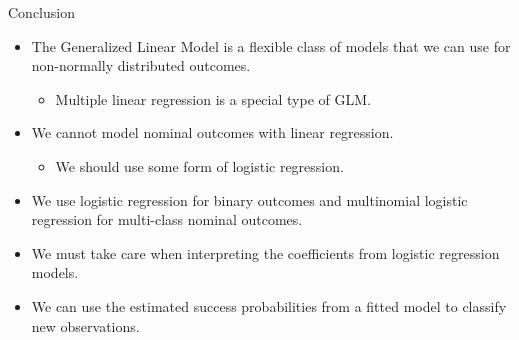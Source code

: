 \documentclass{beamer}\usepackage[]{graphicx}\usepackage[]{color}
\begin{document}
\begin{frame}{Conclusion}
  
  \begin{itemize}
  \item The Generalized Linear Model is a flexible class of models that we can
    use for non-normally distributed outcomes.
    \begin{itemize}
    \item Multiple linear regression is a special type of GLM.
    \end{itemize}
    \vc
  \item We cannot model nominal outcomes with linear regression.
    \begin{itemize}
    \item We should use some form of logistic regression.
    \end{itemize}
    \vc
  \item We use logistic regression for binary outcomes and multinomial logistic
    regression for multi-class nominal outcomes.
    \vc
  \item We must take care when interpreting the coefficients from logistic
    regression models.
    \vc
  \item We can use the estimated success probabilities from a fitted model to
    classify new observations.
  \end{itemize}
  
\end{frame}

\end{document}
